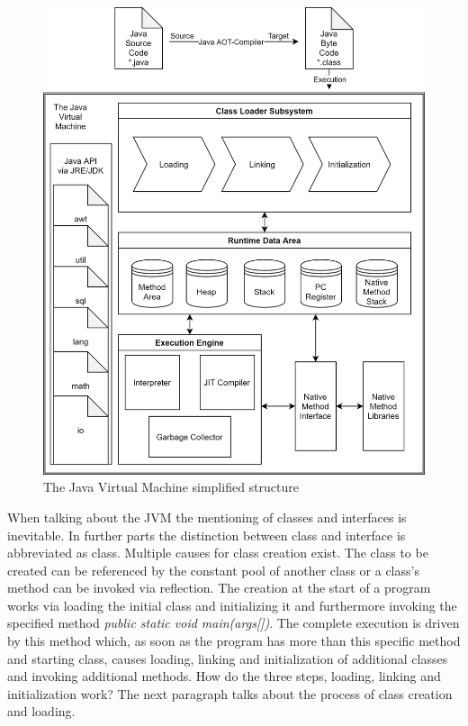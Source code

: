 \begin{figure}
	\includegraphics[scale=0.2]{../figures/JVM.png}
	\caption{The Java Virtual Machine simplified structure}
	\label{fig:jvm}
\end{figure}

When talking about the JVM the mentioning of classes and interfaces is inevitable.
In further parts the distinction between class and interface is abbreviated as class.
Multiple causes for class creation exist. The class to be created can be referenced by the constant pool of another class or a class's method can be invoked via reflection.
The creation at the start of a program works via loading the initial class and initializing it and furthermore invoking the specified method \emph{public static void main(args[])}. The complete execution is driven by this method which, as soon as the program has more than this specific method and starting class, causes loading, linking and initialization of additional classes and invoking additional methods. \cite{Lindholm} How do the three steps, loading, linking and initialization work? The next paragraph talks about the process of class creation and loading.

